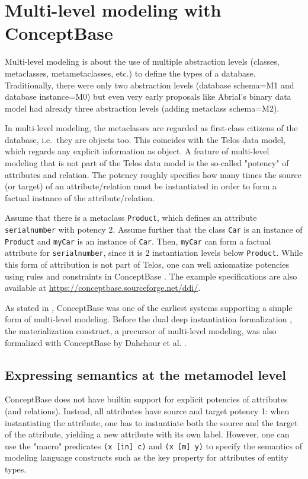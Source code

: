 \section{Multi-level modeling with ConceptBase} \label{sec:mlm}

Multi-level modeling is about the use of multiple abstraction levels
(classes, metaclasses, metametaclasses, etc.) to define the types
of a database. Traditionally, there were only two abstraction
levels (database schema=M1 and database instance=M0) but even very early proposals like Abrial's 
binary data model had already three abstraction levels (adding metaclass schema=M2).

In multi-level modeling, the metaclasses are regarded as first-class
citizens of the database, i.e.\ they are objects too. This coincides
with the Telos data model, which regards any explicit information as
object. A feature of multi-level modeling that is not part of the Telos
data model is the so-called "potency" of attributes and relation.
The potency roughly specifies how many times the source (or target)
of an attribute/relation must be instantiated in order to form a factual
instance of the attribute/relation.

Assume that there is a metaclass {\tt Product}, which defines an
attribute {\tt serialnumber} with potency 2. Assume further that the class
{\tt Car} is an instance of {\tt Product} and {\tt myCar} is an instance of 
{\tt Car}. Then, {\tt myCar} can form a factual attribute for {\tt serialnumber},
since it is 2 instantiation levels below {\tt Product}.
While this form of attribution is not part of Telos, one can well
axiomatize potencies using rules and constraints in ConceptBase \cite{DDI2014}.
The example specifications are also available at
\url{https://conceptbase.sourceforge.net/ddi/}.

As stated in \cite{RLGW2014}, ConceptBase was one of the earliest systems 
supporting a simple form of multi-level modeling. Before the 
dual deep instantiation formalization \cite{DDI2014}, the materialization
construct, a precursor of multi-level modeling, was also formalized
with ConceptBase by Dahchour et al. \cite{DPZ2002}. 

\subsection{Expressing semantics at the metamodel level} \label{sec:semmm}

ConceptBase does not have builtin support for explicit potencies of attributes
(and relations). Instead, all attributes have source and target potency 1:
when instantiating the attribute, one has to instantiate both the source and the
target of the attribute, yielding a new attribute with its own label.
However, one can use the "macro" predicates {\tt (x [in] c)} and
{\tt (x [m] y)} to specify the semantics of modeling language constructs
such as the key property for attributes of entity types.

